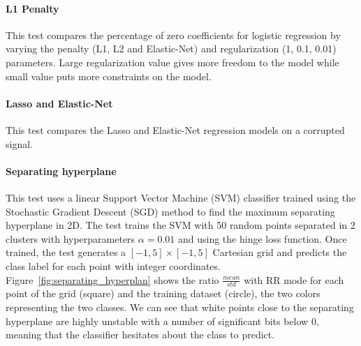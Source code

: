 \documentclass[11pt]{article}
\begin{document}
\paragraph{L1 Penalty}

This test compares the percentage of zero coefficients for logistic regression
by varying the penalty (L1, L2 and Elastic-Net) and regularization (1, 0.1, 0.01) parameters. Large regularization value gives more freedom to the model
while small value puts more constraints on the model.





\paragraph{Lasso and Elastic-Net}


This test compares the Lasso and Elastic-Net regression models
on a corrupted signal.



\paragraph{Separating hyperplane}

This test uses a linear Support Vector Machine (SVM) classifier trained using the Stochastic Gradient Descent (SGD) method to find the maximum separating hyperplane in 2D.
The test trains the SVM with 50 random points separated in 2 clusters with hyperparameters $\alpha=0.01$ and using the hinge loss function. Once trained, the test generates a $[-1,5]\times[-1,5]$ Cartesian grid and predicts the class label for each point with integer coordinates. Figure~\ref{fig:separating_hyperplan} shows the ratio $\frac{mean}{std}$ with RR mode for each point of the grid (square) and the training dataset (circle), the two colors representing the two classes.
We can see that white points close to the separating hyperplane are highly unstable with a number of significant bits below 0, meaning that
the classifier hesitates about the class to predict.
\end{document}
